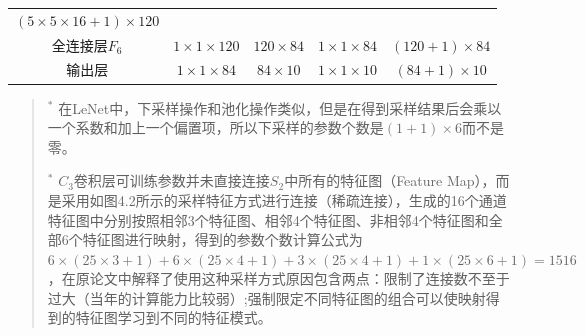 \begin{longtable}[]{ ccccc }
\begin{minipage}[t]{0.24\columnwidth}
\((5\times5\times16+1)\times120\)\strut
\end{minipage}\tabularnewline
\begin{minipage}[t]{0.12\columnwidth}\centering\strut
全连接层\(F_6\)\strut
\end{minipage} & \begin{minipage}[t]{0.16\columnwidth}\centering\strut
\(1\times1\times120\)\strut
\end{minipage} & \begin{minipage}[t]{0.19\columnwidth}\centering\strut
\(120\times84\)\strut
\end{minipage} & \begin{minipage}[t]{0.16\columnwidth}\centering\strut
\(1\times1\times84\)\strut
\end{minipage} & \begin{minipage}[t]{0.24\columnwidth}\centering\strut
\((120+1)\times84\)\strut
\end{minipage}\tabularnewline
\begin{minipage}[t]{0.12\columnwidth}\centering\strut
输出层\strut
\end{minipage} & \begin{minipage}[t]{0.16\columnwidth}\centering\strut
\(1\times1\times84\)\strut
\end{minipage} & \begin{minipage}[t]{0.19\columnwidth}\centering\strut
\(84\times10\)\strut
\end{minipage} & \begin{minipage}[t]{0.16\columnwidth}\centering\strut
\(1\times1\times10\)\strut
\end{minipage} & \begin{minipage}[t]{0.24\columnwidth}\centering\strut
\((84+1)\times10\)\strut
\end{minipage}\tabularnewline
\bottomrule
\end{longtable}

\begin{quote}
​ \(^*\)
在LeNet中，下采样操作和池化操作类似，但是在得到采样结果后会乘以一个系数和加上一个偏置项，所以下采样的参数个数是\((1+1)\times6​\)而不是零。

​ \(^*\)
\(C_3\)卷积层可训练参数并未直接连接\(S_2\)中所有的特征图（Feature
Map），而是采用如图4.2所示的采样特征方式进行连接（稀疏连接），生成的16个通道特征图中分别按照相邻3个特征图、相邻4个特征图、非相邻4个特征图和全部6个特征图进行映射，得到的参数个数计算公式为\(6\times(25\times3+1)+6\times(25\times4+1)+3\times(25\times4+1)+1\times(25\times6+1)=1516\)，在原论文中解释了使用这种采样方式原因包含两点：限制了连接数不至于过大（当年的计算能力比较弱）;强制限定不同特征图的组合可以使映射得到的特征图学习到不同的特征模式。
\end{quote}

